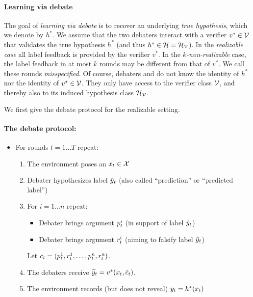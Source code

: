 \documentclass[11pt,letterpaper]{article}
\theoremstyle{definition}
\theoremstyle{plain}
\begin{document}

\paragraph{Learning via debate} The goal of \emph{learning via debate} is to recover an underlying \emph{true hypothesis}, which we denote by $h^*$. We assume that the two debaters interact with a verifier $v^*\in{\mathcal V}$ that validates the true hypothesis $h^*$ (and thus $h^*\in{{\mathcal H}} = {{\mathcal H}}_{\mathcal V}$).
In the \emph{realizable case} all label feedback is provided by the verifier $v^*$.
In the \emph{$k$-non-realizable} case, the label feedback in at most $k$ rounds may be different from that of $v^*$. We call these rounds \emph{misspecified}. Of course, debaters \dt and \df do not know the identity of $h^*$ nor the identity of $v^*\in{\mathcal V}$. They only have access to the verifier class ${\mathcal V}$, and thereby also to its induced hypothesis class ${{\mathcal H}}_{\mathcal V}$.

We first give the debate protocol for the realizable setting. 
\paragraph{The debate protocol:}
\begin{itemize}
\item For rounds $t = 1\ldots T$ repeat:
\begin{enumerate}
 \item The environment poses an $x_t\in{\mathcal X}$
 \item Debater \dt hypothesizes label ${\hat{y}}_t$ (also called ``prediction'' or ``predicted label'')
 \item For $i = 1 \ldots n$ repeat:
 \begin{itemize}
  \item Debater \dt brings argument ${p}^i_t$ (in support of label ${\hat{y}}_t$)
  \item Debater \df brings argument ${r}^i_t$ (aiming to falsify label ${\hat{y}}_t$)
 \end{itemize}
Let $\bar{c}_t=({p}^1_t,{r}^1_t,\ldots,{p}^n_t,{r}^n_t)$.
 \item The debaters receive ${\widetilde{y}}_t=v^*(x_t,\bar{c}_t)$. 
 \item %
       The environment records (but does not reveal) $y_t = h^*(x_t)$ 
\end{enumerate}
\end{itemize}
\end{document}

